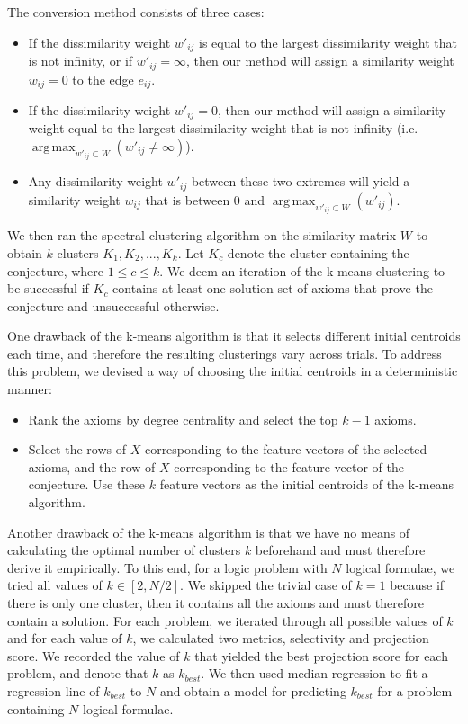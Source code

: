 \documentclass[EPiC]{easychair}
\DeclareMathOperator*{\argmaxA}{arg\,max} %
\begin{document}
The conversion method consists of three cases:
\begin{itemize}
\item If the dissimilarity weight $w'_{ij}$ is equal to the largest 
dissimilarity weight that is not infinity, or if $w'_{ij} = \infty$, then 
our method will assign a similarity weight $w_{ij} = 0$ to the edge $e_{ij}$.

\item If the dissimilarity weight $w'_{ij} = 0$, then our method will assign 
a similarity weight equal to the largest dissimilarity weight that is not 
infinity (i.e. $\argmaxA_{w'_{ij} \subset W} (w'_{ij} \neq \infty)$).

\item Any dissimilarity weight $w'_{ij}$ between these two extremes will 
yield a similarity weight $w_{ij}$ that is between 
$0$ and $\argmaxA_{w'_{ij} \subset W} (w'_{ij})$.
\end{itemize}

We then ran the spectral clustering algorithm on the similarity matrix $W$ 
to obtain $k$ clusters $K_{1}, K_{2}, ..., K_{k}$. Let $K_{c}$ denote the 
cluster containing the conjecture, where $1 \leq c \leq k$. We deem an
iteration of the k-means clustering to be successful if $K_{c}$ contains at 
least one solution set of axioms that prove the conjecture and unsuccessful 
otherwise.

One drawback of the k-means algorithm is that it selects different initial 
centroids each time, and therefore the resulting clusterings vary across 
trials. To address this problem, we devised a way of choosing the initial 
centroids in a deterministic manner:
\begin{itemize}
\item Rank the axioms by degree centrality and select the top $k-1$ axioms.
\item Select the rows of $X$ corresponding to the feature vectors of the
selected axioms, and the row of $X$ corresponding to the feature vector of 
the conjecture. Use these $k$ feature vectors as the initial centroids of 
the k-means algorithm. 
\end{itemize}

Another drawback of the k-means algorithm is that we have no means of 
calculating the optimal number of clusters $k$ beforehand and must therefore 
derive it empirically. To this end, for a logic problem with $N$ logical 
formulae, we tried all values of $k \in [2, N/2]$. We skipped the trivial 
case of $k=1$ because if there is only one cluster, then it contains all the 
axioms and must therefore contain a solution. For each problem, we iterated
through all possible values of $k$ and for each value of $k$, we calculated 
two metrics, selectivity and projection score. We recorded the value of $k$
that yielded the best projection score for each problem, and denote that 
$k$ as $k_{best}$. We then used median regression to fit a regression line 
of $k_{best}$ to $N$ and obtain a model for predicting $k_{best}$ for a 
problem containing $N$ logical formulae.
\end{document}

